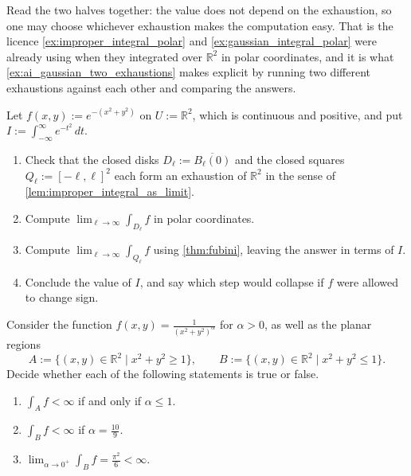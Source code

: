 \begin{remark}
\label{rem:improper_exhaustion_free_choice}
Read the two halves together: the value does not depend on the exhaustion, so one may choose
whichever exhaustion makes the computation easy. That is the licence
\cref{ex:improper_integral_polar} and \cref{ex:gaussian_integral_polar} were already using when
they integrated over $\mathbb{R}^2$ in polar coordinates, and it is what
\cref{ex:ai_gaussian_two_exhaustions} makes explicit by running two different exhaustions against
each other and comparing the answers.
\end{remark}

\begin{aiexercise}
\label{ex:ai_gaussian_two_exhaustions}
Let $f(x,y) := e^{-(x^2+y^2)}$ on $U := \mathbb{R}^2$, which is continuous and positive, and put
$I := \int_{-\infty}^{\infty} e^{-t^2}\,dt$.
\begin{enumerate}[label=\textbf{(\alph*)}]
  \item Check that the closed disks $D_\ell := \overline{B_\ell(0)}$ and the closed squares
    $Q_\ell := [-\ell,\ell]^2$ each form an exhaustion of $\mathbb{R}^2$ in the sense of
    \cref{lem:improper_integral_as_limit}.
  \item Compute $\lim_{\ell\to\infty}\int_{D_\ell} f$ in polar coordinates.
  \item Compute $\lim_{\ell\to\infty}\int_{Q_\ell} f$ using \cref{thm:fubini}, leaving the answer
    in terms of $I$.
  \item Conclude the value of $I$, and say which step would collapse if $f$ were allowed to
    change sign.
\end{enumerate}
\end{aiexercise}

\begin{exercise}
\label{ex:examHS24_TF_improper}
Consider the function $f(x,y) = \frac{1}{(x^2+y^2)^\alpha}$ for $\alpha > 0$, as well as the planar
regions
\[ A := \{ (x,y) \in \mathbb{R}^2 \mid x^2+y^2 \ge 1 \}, \qquad
   B := \{ (x,y) \in \mathbb{R}^2 \mid x^2+y^2 \le 1 \}. \]
Decide whether each of the following statements is true or false.
\begin{enumerate}[label=\textbf{(\alph*)}]
  \item $\int_A f < \infty$ if and only if $\alpha \le 1$.
  \item $\int_B f < \infty$ if $\alpha = \frac{10}{9}$.
  \item $\lim_{\alpha \to 0^+} \int_B f = \frac{\pi^2}{6} < \infty$.
\end{enumerate}
\end{exercise}

